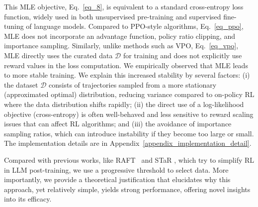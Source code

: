 This MLE objective, Eq.~\ref{eq_8}, is equivalent to a standard cross-entropy loss function, widely used in both unsupervised pre-training \cite{radford2018improving} and supervised fine-tuning \cite{ouyang2022training} of language models.
Compared to PPO-style algorithms, Eq.~\ref{eq_ppo}, MLE does not incorporate an advantage function, policy ratio clipping, and importance sampling.
Similarly, unlike methods such as VPO, Eq.~\ref{eq_vpo}, MLE directly uses the curated data $\mathcal{D}$ for training and does not explicitly use reward values in the loss computation.
We empirically observed that MLE leads to more stable training. We explain this increased stability by several factors: (i) the dataset $\mathcal{D}$ consists of trajectories sampled from a more stationary (approximated optimal) distribution, reducing variance compared to on-policy RL where the data distribution shifts rapidly; (ii) the direct use of a log-likelihood objective (cross-entropy) is often well-behaved and less sensitive to reward scaling issues that can affect RL algorithms; and (iii) the avoidance of importance sampling ratios, which can introduce instability if they become too large or small.
The implementation details are in Appendix~\ref{appendix_implementation_detail}.

Compared with previous works, like RAFT~\cite{dongraft} and STaR \cite{zelikman2022star}, which try to simplify RL in LLM post-training, we use a progressive threshold to select data.
More importantly, we provide a theoretical justification that elucidates why this approach, yet relatively simple, yields strong performance, offering novel insights into its efficacy.



